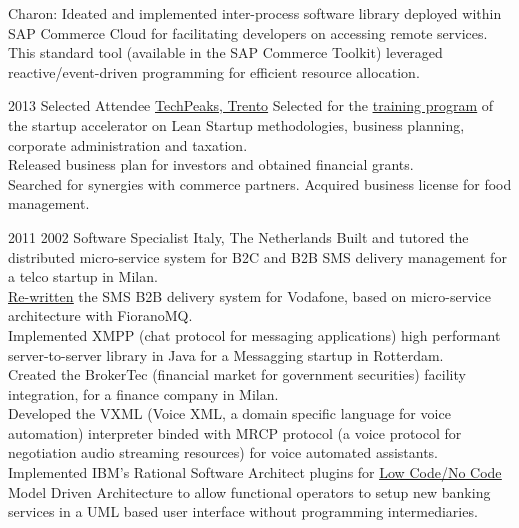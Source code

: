 \documentclass[letterpaper]{twentysecondcv} %
\begin{document}
\begin{twenty}
{        \textbullet Charon: Ideated and implemented inter-process software library deployed within SAP Commerce Cloud for facilitating developers on accessing remote services. This standard tool (available in the SAP Commerce Toolkit) leveraged reactive/event-driven programming for efficient resource allocation.\\
	    }
     
     \twentyitem
   		{2013}
		{}
        {Selected Attendee}
        {\href{https://www.repubblica.it/rubriche/startup-stories/2013/12/02/news/incubatore_startup-72502909/}{TechPeaks, Trento}}
        {}
        {
Selected for the \href{https://www.repubblica.it/rubriche/startup-stories/2013/12/02/news/incubatore_startup-72502909/}{\underline{training program}} of the startup accelerator on Lean Startup methodologies, business planning, corporate administration and taxation.\\
Released business plan for investors and obtained financial grants.\\
Searched for synergies with commerce partners. Acquired business license for food management.\\
    	}
    	
    	\twentyitem
    	{2011}
    	{2002}
    	{Software Specialist}
    	{Italy, The Netherlands}
    	{}
    	{
    	\textbullet Built and tutored the distributed micro-service system for B2C and B2B SMS delivery management for a telco startup in Milan.\\
    	\textbullet\href{https://gfrison.com/2009/04/24/powered-by-apache-mina/}{\underline{Re-written}} the SMS B2B delivery system for Vodafone, based on micro-service architecture with FioranoMQ.\\
    	\textbullet Implemented XMPP (chat protocol for messaging applications) high performant server-to-server library in Java for a Messagging startup in Rotterdam.\\
    	\textbullet Created the BrokerTec (financial market for government securities) facility integration, for a finance company in Milan.\\
		\textbullet Developed the VXML (Voice XML, a domain specific language for voice automation) interpreter binded with MRCP protocol (a voice protocol for negotiation audio streaming resources) for voice automated assistants.\\
		\textbullet Implemented IBM's Rational Software Architect plugins for \href{https://gfrison.com/tags/\#low-code-no-code}{\underline{Low Code/No Code}} Model Driven Architecture to allow functional operators to setup new banking services in a UML based user interface without programming intermediaries.
       	}

\end{twenty}
\end{document}
